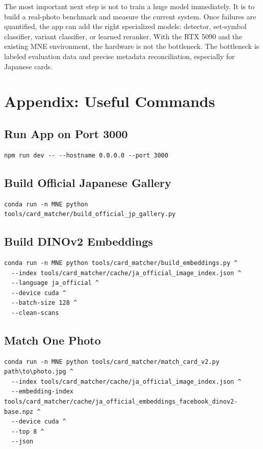 \documentclass[11pt,a4paper]{article}
\begin{document}
The most important next step is not to train a huge model immediately. It is to build a real-photo benchmark and measure the current system. Once failures are quantified, the app can add the right specialized models: detector, set-symbol classifier, variant classifier, or learned reranker. With the RTX 5090 and the existing MNE environment, the hardware is not the bottleneck. The bottleneck is labeled evaluation data and precise metadata reconciliation, especially for Japanese cards.

\appendix

\section{Appendix: Useful Commands}

\subsection{Run App on Port 3000}

\begin{lstlisting}
npm run dev -- --hostname 0.0.0.0 --port 3000
\end{lstlisting}

\subsection{Build Official Japanese Gallery}

\begin{lstlisting}
conda run -n MNE python tools/card_matcher/build_official_jp_gallery.py
\end{lstlisting}

\subsection{Build DINOv2 Embeddings}

\begin{lstlisting}
conda run -n MNE python tools/card_matcher/build_embeddings.py ^
  --index tools/card_matcher/cache/ja_official_image_index.json ^
  --language ja_official ^
  --device cuda ^
  --batch-size 128 ^
  --clean-scans
\end{lstlisting}

\subsection{Match One Photo}

\begin{lstlisting}
conda run -n MNE python tools/card_matcher/match_card_v2.py path\to\photo.jpg ^
  --index tools/card_matcher/cache/ja_official_image_index.json ^
  --embedding-index tools/card_matcher/cache/ja_official_embeddings_facebook_dinov2-base.npz ^
  --device cuda ^
  --top 8 ^
  --json
\end{lstlisting}
\end{document}
